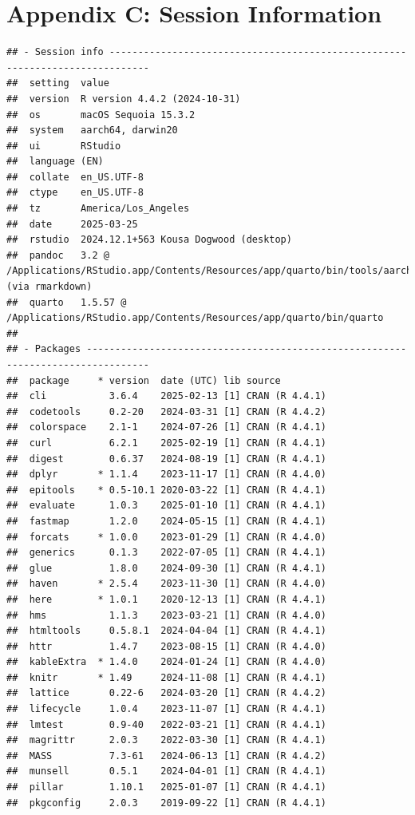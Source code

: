 \documentclass[
]{article}
\begin{document}
\section{Appendix C: Session
Information}\label{appendix-c-session-information}

\begin{verbatim}
## - Session info -----------------------------------------------------------------------------
##  setting  value
##  version  R version 4.4.2 (2024-10-31)
##  os       macOS Sequoia 15.3.2
##  system   aarch64, darwin20
##  ui       RStudio
##  language (EN)
##  collate  en_US.UTF-8
##  ctype    en_US.UTF-8
##  tz       America/Los_Angeles
##  date     2025-03-25
##  rstudio  2024.12.1+563 Kousa Dogwood (desktop)
##  pandoc   3.2 @ /Applications/RStudio.app/Contents/Resources/app/quarto/bin/tools/aarch64/ (via rmarkdown)
##  quarto   1.5.57 @ /Applications/RStudio.app/Contents/Resources/app/quarto/bin/quarto
## 
## - Packages ---------------------------------------------------------------------------------
##  package     * version  date (UTC) lib source
##  cli           3.6.4    2025-02-13 [1] CRAN (R 4.4.1)
##  codetools     0.2-20   2024-03-31 [1] CRAN (R 4.4.2)
##  colorspace    2.1-1    2024-07-26 [1] CRAN (R 4.4.1)
##  curl          6.2.1    2025-02-19 [1] CRAN (R 4.4.1)
##  digest        0.6.37   2024-08-19 [1] CRAN (R 4.4.1)
##  dplyr       * 1.1.4    2023-11-17 [1] CRAN (R 4.4.0)
##  epitools    * 0.5-10.1 2020-03-22 [1] CRAN (R 4.4.1)
##  evaluate      1.0.3    2025-01-10 [1] CRAN (R 4.4.1)
##  fastmap       1.2.0    2024-05-15 [1] CRAN (R 4.4.1)
##  forcats     * 1.0.0    2023-01-29 [1] CRAN (R 4.4.0)
##  generics      0.1.3    2022-07-05 [1] CRAN (R 4.4.1)
##  glue          1.8.0    2024-09-30 [1] CRAN (R 4.4.1)
##  haven       * 2.5.4    2023-11-30 [1] CRAN (R 4.4.0)
##  here        * 1.0.1    2020-12-13 [1] CRAN (R 4.4.1)
##  hms           1.1.3    2023-03-21 [1] CRAN (R 4.4.0)
##  htmltools     0.5.8.1  2024-04-04 [1] CRAN (R 4.4.1)
##  httr          1.4.7    2023-08-15 [1] CRAN (R 4.4.0)
##  kableExtra  * 1.4.0    2024-01-24 [1] CRAN (R 4.4.0)
##  knitr       * 1.49     2024-11-08 [1] CRAN (R 4.4.1)
##  lattice       0.22-6   2024-03-20 [1] CRAN (R 4.4.2)
##  lifecycle     1.0.4    2023-11-07 [1] CRAN (R 4.4.1)
##  lmtest        0.9-40   2022-03-21 [1] CRAN (R 4.4.1)
##  magrittr      2.0.3    2022-03-30 [1] CRAN (R 4.4.1)
##  MASS          7.3-61   2024-06-13 [1] CRAN (R 4.4.2)
##  munsell       0.5.1    2024-04-01 [1] CRAN (R 4.4.1)
##  pillar        1.10.1   2025-01-07 [1] CRAN (R 4.4.1)
##  pkgconfig     2.0.3    2019-09-22 [1] CRAN (R 4.4.1)

\end{verbatim}
\end{document}
